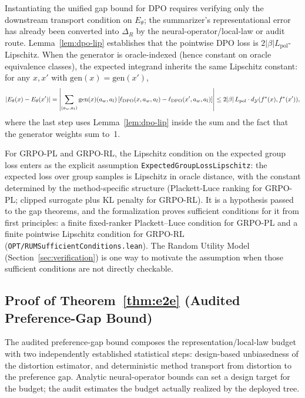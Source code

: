 Instantiating the unified gap bound for DPO requires verifying only the downstream transport condition on $E_\theta$; the summarizer's representational error has already been converted into $\Delta_R$ by the neural-operator/local-law or audit route. Lemma~\ref{lem:dpo-lip} establishes that the pointwise DPO loss is $2|\beta|L_{\mathrm{pol}}$-Lipschitz. When the generator is oracle-indexed (hence constant on oracle equivalence classes), the expected integrand inherits the same Lipschitz constant: for any $x, x'$ with $\mathrm{gen}(x) = \mathrm{gen}(x')$,
\[
|E_\theta(x) - E_\theta(x')| = \left|\sum_{(a_w, a_l)} \mathrm{gen}(x)(a_w, a_l)\, [\ell_{\mathrm{DPO}}(x, a_w, a_l) - \ell_{\mathrm{DPO}}(x', a_w, a_l)]\right| \le 2|\beta|\,L_{\mathrm{pol}} \cdot d_{\mathcal{Y}}(f^\ast(x), f^\ast(x')),
\]
where the last step uses Lemma~\ref{lem:dpo-lip} inside the sum and the fact that the generator weights sum to~1.

For GRPO-PL and GRPO-RL, the Lipschitz condition on the expected group loss enters as the explicit assumption \texttt{ExpectedGroupLossLipschitz}: the expected loss over group samples is Lipschitz in oracle distance, with the constant determined by the method-specific structure (Plackett-Luce ranking for GRPO-PL; clipped surrogate plus KL penalty for GRPO-RL). It is a hypothesis passed to the gap theorems, and the formalization proves sufficient conditions for it from first principles: a finite fixed-ranker Plackett--Luce condition for GRPO-PL and a finite pointwise Lipschitz condition for GRPO-RL (\texttt{OPT/RUMSufficientConditions.lean}). The Random Utility Model (Section~\ref{sec:verification}) is one way to motivate the assumption when those sufficient conditions are not directly checkable.

\subsection{Proof of Theorem~\ref{thm:e2e} (Audited Preference-Gap Bound)}\label{app:proof-e2e}

The audited preference-gap bound composes the representation/local-law budget with two independently established statistical steps: design-based unbiasedness of the distortion estimator, and deterministic method transport from distortion to the preference gap. Analytic neural-operator bounds can set a design target for the budget; the audit estimates the budget actually realized by the deployed tree.

